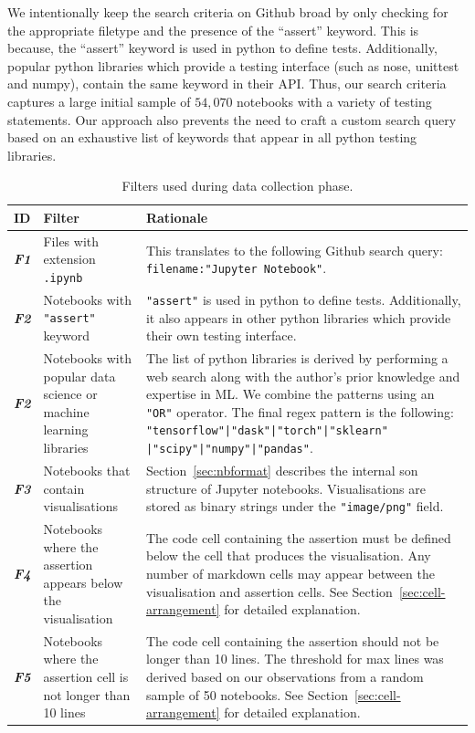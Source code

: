 \documentclass[acmsmall,screen,review,anonymous]{acmart}
\begin{document}
We intentionally keep the search criteria on Github broad by only
checking for the appropriate filetype and the presence of the
``assert'' keyword. This is because, the ``assert'' keyword is used in
python to define tests. Additionally, popular python libraries which
provide a testing interface (such as nose, unittest and numpy),
contain the same keyword in their API. Thus, our search criteria
captures a large initial sample of $54,070$ notebooks with a variety
of testing statements. Our approach also prevents the need to craft a
custom search query based on an exhaustive list of keywords that
appear in all python testing libraries.

\begin{table}
  \centering
  \caption{Filters used during data collection phase.}
  \begin{tabular}{l p{} p{}}
    \toprule
    \textbf{ID} &
    \textbf{Filter} &
    \textbf{Rationale}\\
    \midrule
    \emph{\textbf{F1}} &
    Files with extension \texttt{.ipynb} &
    This translates to the following Github search query:
    \texttt{filename:"Jupyter Notebook"}.\\
    \emph{\textbf{F2}} &
    Notebooks with \texttt{"assert"} keyword &
    \texttt{"assert"} is used in python to define tests. Additionally,
    it also appears in other python libraries which provide their own
    testing interface.\\
    \emph{\textbf{F2}} &
    Notebooks with popular data science or machine learning libraries &
    The list of python libraries is derived by performing a web search
    along with the author's prior knowledge and expertise in ML. We
    combine the patterns using an \texttt{"OR"} operator. The final
    regex pattern is the following:
    \texttt{"tensorflow"|"dask"|"torch"|"sklearn"
    |"scipy"|"numpy"|"pandas"}.\\
    \emph{\textbf{F3}} &
    Notebooks that contain visualisations &
    Section~\ref{sec:nbformat} describes the internal son structure
    of Jupyter notebooks. Visualisations are stored as binary strings
    under the \texttt{"image/png"} field.\\
    \emph{\textbf{F4}} &
    Notebooks where the assertion appears below the visualisation &
    The code cell containing the assertion must be defined below the
    cell that produces the visualisation. Any number of markdown cells
    may appear between the visualisation and assertion cells. See
    Section~\ref{sec:cell-arrangement} for detailed explanation.\\
    \emph{\textbf{F5}} &
    Notebooks where the assertion cell is not longer than 10 lines &
    The code cell containing the assertion should not be longer than
    10 lines. The threshold for max lines was derived based on our
    observations from a random sample of 50 notebooks. See
    Section~\ref{sec:cell-arrangement} for detailed explanation.\\
    \bottomrule
  \end{tabular}
  \label{tab:filters}
\end{table}
\end{document}
